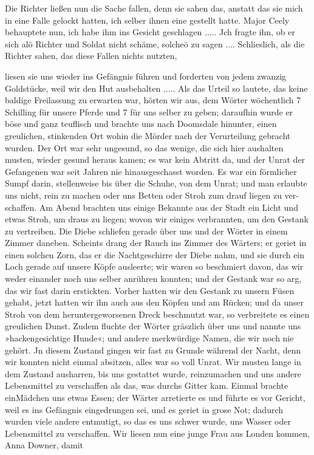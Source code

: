 Die Richter ließen nun die Sache fallen,
denn sie sahen das, anstatt das sie mich in eine Falle gelockt hatten,
ich selber ihnen eine gestellt hatte. Major Ceely behauptete nun,
ich habe ihm ins Gesicht geschlagen ..... Jch fragte ihn, ob er
sich alö Richter und Soldat nicht schäme, solcheö zu sagen ....
Schlieslich, als die Richter sahen, das diese Fallen nichts nutzten,


liesen sie uns wieder ins Gefängnis führen und forderten von
jedem zwanzig Goldstücke, weil wir den Hut ausbehalten .....
Als das Urteil so lautete, das keine baldige Freilassung
zu erwarten war, hörten wir aus, dem Wörter wöchentlich
7 Schilling für unsere Pferde und 7 für uns selber zu geben;
daraufhin wurde er böse und ganz teuflisch und brachte uns nach
Doomsdale hinunter, einen greulichen, stinkenden Ort wohin die
Mörder nach der Verurteilung gebracht wurden. Der Ort war
sehr ungesund, so das wenige, die sich hier aushalten musten,
wieder gesund heraus kamen; es war kein Abtritt da, und der
Unrat der Gefangenen war seit Jahren nie hinausgeschasst worden.
Es war ein förmlicher Sumpf darin, stellenweise bis über die
Schuhe, von dem Unrat; und man erlaubte uns nicht, rein zu
machen oder uns Betten oder Stroh zum drauf liegen zu ver-
schaffen. Am Abend brachten uns einige Bekannte aus der Stadt
ein Licht und etwas Stroh, um draus zu liegen; wovon wir einiges
verbrannten, um den Gestank zu vertreiben. Die Diebe schliefen
gerade über uns und der Wörter in einem Zimmer daneben.
Scheints drang der Rauch ins Zimmer des Wärters; er geriet
in einen solchen Zorn, das er die Nachtgeschirre der Diebe nahm,
und sie durch ein Loch gerade auf unsere Köpfe ausleerte; wir
waren so beschmiert davon, das wir weder einander noch uns selber
anrühren konnten; und der Gestank war so arg, das wir fast
darin erstickten. Vorher hatten wir den Gestank zu unsern Füsen
gehabt, jetzt hatten wir ihn auch aus den Köpfen und am Rücken;
und da unser Stroh von dem heruntergeworsenen Dreck beschmutzt
war, so verbreitete es einen greulichen Dunst. Zudem fluchte der
Wörter gräszlich über uns und nannte uns »hackengesichtige Hunde«;
und andere merkwürdige Namen, die wir noch nie gehört. Jn
diesem Zustand gingen wir fast zu Grunde während der Nacht,
denn wir konnten nicht einmal absitzen, alles war so voll Unrat.
Wir musten lange in dem Zustand ausharren, bis uns gestattet
wurde, reinzumachen und uns andere Lebensmittel zu verschaffen als
das, was durchs Gitter kam. Einmal brachte einMädchen uns etwas
Essen; der Wärter arretierte es und führte es vor Gericht, weil
es ins Gefängnis eingedrungen sei, und es geriet in grose Not;
dadurch wurden viele andere entmutigt, so das es uns schwer
wurde, uns Wasser oder Lebensmittel zu verschaffen. Wir liesen
nun eine junge Frau aus Londen kommen, Anna Downer, damit


